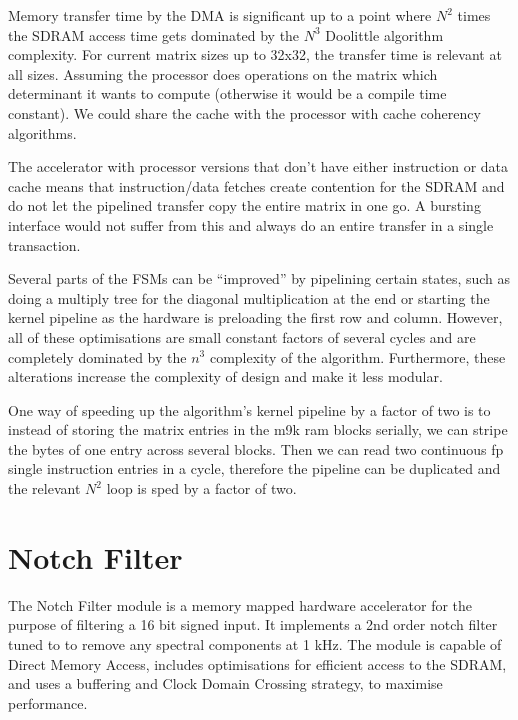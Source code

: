 \documentclass[]{article}
\begin{document}

Memory transfer time by the DMA is significant up to a point where $N^2$ times the SDRAM access time gets dominated by the $N^3$ Doolittle algorithm complexity. For current matrix sizes up to 32x32, the transfer time is relevant at all sizes. Assuming the processor does operations on the matrix which determinant it wants to compute (otherwise it would be a compile time constant). We could share the cache with the processor with cache coherency algorithms.

The accelerator with processor versions that don't have either instruction or data cache means that instruction/data fetches create contention for the SDRAM and do not let the pipelined transfer copy the entire matrix in one go. A bursting interface would not suffer from this and always do an entire transfer in a single transaction.

Several parts of the FSMs can be “improved” by pipelining certain states, such as doing a multiply tree for the diagonal multiplication at the end or starting the kernel pipeline as the hardware is preloading the first row and column. However, all of these optimisations are small constant factors of several cycles and are completely dominated by the $n^3$ complexity of the algorithm. Furthermore, these alterations increase the complexity of design and make it less modular.

One way of speeding up the algorithm’s kernel pipeline by a factor of two is to instead of storing the matrix entries in the m9k ram blocks serially, we can stripe the bytes of one entry across several blocks. Then we can read two continuous fp single instruction entries in a cycle, therefore the pipeline can be duplicated and the relevant $N^2$ loop is sped by a factor of two.









\section{Notch Filter} %
\label{sec:notch_filter}

The Notch Filter module is a memory mapped hardware accelerator for the purpose of filtering a 16 bit signed input. It implements a 2nd order notch filter tuned to to remove any spectral components at 1 kHz.
The module is capable of Direct Memory Access, includes optimisations for efficient access to the SDRAM, and uses a buffering and Clock Domain Crossing strategy, to maximise performance.
\end{document}
